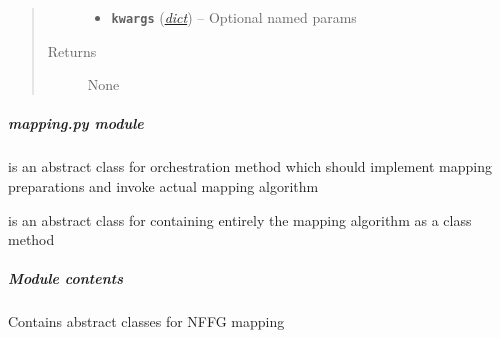 \documentclass[letterpaper,10pt,english]{sphinxmanual}
\begin{document}
\begin{fulllineitems}
\begin{fulllineitems}
\begin{quote}
\begin{description}
\begin{itemize}
\item {} 
\textbf{\texttt{kwargs}} (\href{https://docs.python.org/2.7/library/stdtypes.html\#dict}{\emph{dict}}) -- Optional named params

\end{itemize}

\item[{Returns}] \leavevmode
None

\end{description}\end{quote}

\end{fulllineitems}


\end{fulllineitems}



\subparagraph{\emph{mapping.py} module}
\label{util/mapping:mapping-py-module}\label{util/mapping::doc}
{\hyperref[util/mapping:escape.util.mapping.AbstractMapper]{\emph{}}} is an abstract class for orchestration method which
should implement mapping preparations and invoke actual mapping algorithm

{\hyperref[util/mapping:escape.util.mapping.AbstractMappingStrategy]{\emph{}}} is an abstract class for containing entirely
the mapping algorithm as a class method


\subparagraph{Module contents}
\label{util/mapping:module-escape.util.mapping}\label{util/mapping:module-contents}
Contains abstract classes for NFFG mapping
\end{document}
